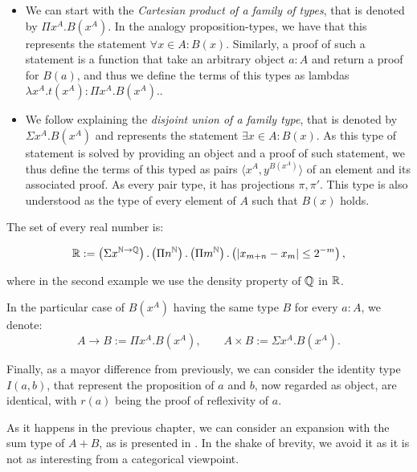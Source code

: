 \begin{itemize}
\item We can start with the \emph{Cartesian product of a family of types}, that is denoted by $\Pi x^A. B(x^A)$. In the analogy proposition-types, we have that this represents the statement $\forall x \in A : B(x)$. Similarly, a proof of such a statement is a function that take an arbitrary object $a:A$ and return a proof for $B(a)$, and thus we define the terms of this types as lambdas $\lambda x^A.t(x^A) : \Pi x^A. B(x^A).$.\\


\item We follow explaining the \emph{disjoint union of a family type}, that is denoted by $\Sigma x^A. B(x^A)$ and represents the statement $\exists x \in A : B(x)$. As this type of statement is solved by providing an object and a proof of such statement, we thus define the terms of this typed as pairs $\langle x^A, y^{B(x^A)}\rangle$ of an element and its associated proof. As every pair type, it has projections $\pi,\pi'$. This type is also understood as the type of every element of $A$ such that $B(x)$ holds.
\end{itemize}
\begin{example}
  The set of every real number is:

  $$\mathbb{R} := \left(\Sigma x^{\mathbb{N}\to\mathbb{Q}}\right).\left(\Pi n^{\mathbb{N}}\right).\left(\Pi m^{\mathbb{N}}\right).\left(|x_{m+n} - x_m| \le 2^{-m}\right),$$
  
  where in the second example we use the density property of $\mathbb{Q}$ in $\mathbb{R}$.\\
\end{example}

In the particular case of $B(x^A)$ having the same type $B$ for every $a:A$, we denote:
$$A\to B:= \Pi x^A. B(x^A),\qquad A\times B := \Sigma x^A. B(x^A).$$

Finally, as a mayor difference from previously, we can consider the identity type $I(a,b)$, that represent the proposition of $a$ and $b$, now regarded as object, are identical, with $r(a)$ being the proof of reflexivity of $a$. 


\begin{remark}
  As it happens in the previous chapter, we can consider an expansion with the sum type of $A+B$, as is presented in \cite[Section 1.6]{martinlof1973intuitionistic}. In the shake of brevity, we avoid it as it is not as interesting from a categorical viewpoint.
\end{remark}

